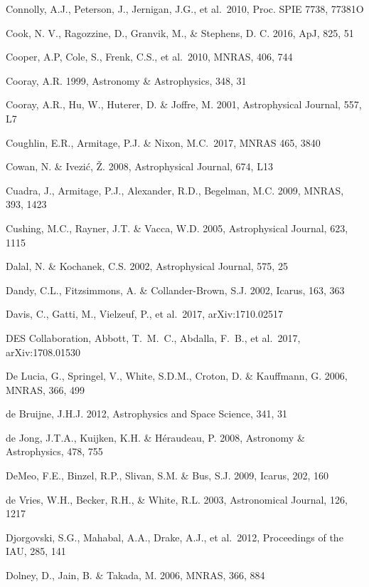 \documentclass{emulateapj}
\begin{document}
\begin{thebibliography}{}
\bibitem[()]{} Connolly, A.J., Peterson, J., Jernigan, J.G., et al.~2010, Proc. SPIE 7738, 77381O

\bibitem[()]{}Cook, N. V., Ragozzine, D., Granvik, M., \& Stephens, D. C. 2016, ApJ, 825, 51

\bibitem[()]{} Cooper, A.P, Cole, S., Frenk, C.S., et al.~2010, MNRAS, 406, 744

\bibitem[()]{} Cooray, A.R. 1999, Astronomy \& Astrophysics, 348, 31

\bibitem[()]{} Cooray, A.R., Hu, W., Huterer, D. \& Joffre, M. 2001, Astrophysical Journal, 557, L7

\bibitem[()]{} Coughlin, E.R., Armitage,  P.J. \&  Nixon, M.C.~2017, MNRAS 465, 3840

\bibitem[()]{} Cowan, N. \& Ivezi\'{c}, \v{Z}. 2008, Astrophysical Journal, 674, L13

\bibitem[()]{} Cuadra, J., Armitage, P.J., Alexander, R.D., Begelman, M.C. 2009, MNRAS, 393, 1423

\bibitem[()]{} Cushing, M.C., Rayner, J.T. \& Vacca, W.D. 2005, Astrophysical Journal, 623, 1115

\bibitem[()]{} Dalal, N. \& Kochanek, C.S. 2002, Astrophysical Journal, 575, 25

\bibitem[()]{} Dandy, C.L., Fitzsimmons, A. \& Collander-Brown, S.J. 2002, Icarus, 163, 363

\bibitem[()]{} Davis, C., Gatti, M., Vielzeuf, P., et al.\ 2017, arXiv:1710.02517

\bibitem[()]{} DES Collaboration, Abbott, T.~M.~C., Abdalla, F.~B., et al.\ 2017, arXiv:1708.01530

\bibitem[()]{} De Lucia, G., Springel, V., White, S.D.M., Croton, D. \& Kauffmann, G. 2006, MNRAS, 366, 499

\bibitem[()]{} de Bruijne, J.H.J. 2012, Astrophysics and Space Science, 341, 31

\bibitem[()]{} de Jong, J.T.A., Kuijken, K.H. \& H\'{e}raudeau, P. 2008, Astronomy \& Astrophysics, 478, 755

\bibitem[()]{} DeMeo, F.E., Binzel, R.P., Slivan, S.M. \& Bus, S.J. 2009, Icarus, 202, 160

\bibitem[()]{} de Vries, W.H., Becker, R.H., \& White, R.L. 2003, Astronomical Journal, 126, 1217

\bibitem[()]{} Djorgovski, S.G., Mahabal, A.A., Drake, A.J., et al.~2012, Proceedings of the IAU, 285, 141

\bibitem[()]{} Dolney, D., Jain, B. \& Takada, M. 2006, MNRAS, 366, 884


\end{thebibliography}
\end{document}
